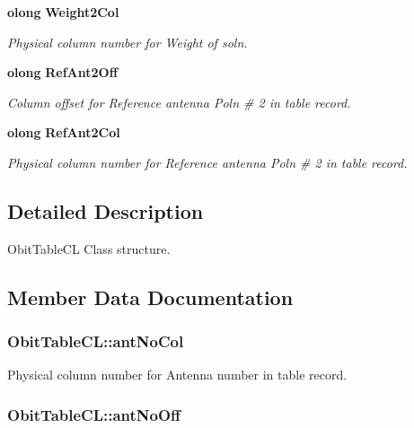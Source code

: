 \begin{CompactItemize}
{\bf olong} {\bf Weight2Col}
\begin{CompactList}\small\item\em Physical column number for Weight of soln. \item\end{CompactList}\item 
{\bf olong} {\bf Ref\-Ant2Off}
\begin{CompactList}\small\item\em Column offset for Reference antenna Poln \# 2 in table record. \item\end{CompactList}\item 
{\bf olong} {\bf Ref\-Ant2Col}
\begin{CompactList}\small\item\em Physical column number for Reference antenna Poln \# 2 in table record. \item\end{CompactList}\end{CompactItemize}


\subsection{Detailed Description}
Obit\-Table\-CL Class structure. 



\subsection{Member Data Documentation}
\subsubsection{ {\bf Obit\-Table\-CL::ant\-No\-Col}}\label{structObitTableCL_o28}


Physical column number for Antenna number in table record. 

\subsubsection{ {\bf Obit\-Table\-CL::ant\-No\-Off}}\label{structObitTableCL_o27}


